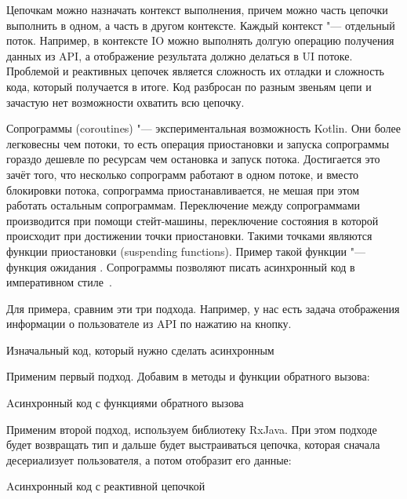 Цепочкам можно назначать контекст выполнения, причем можно часть цепочки выполнить в одном, а часть в другом контексте.
Каждый контекст "--- отдельный поток.
Например, в контексте IO можно выполнять долгую операцию получения данных из API, а отображение результата должно делаться в UI потоке.
Проблемой и реактивных цепочек является сложность их отладки и сложность кода, который получается в итоге.
Код разбросан по разным звеньям цепи и зачастую нет возможности охватить всю цепочку.

Сопрограммы (coroutines) "--- экспериментальная возможность Kotlin.
Они более легковесны чем потоки, то есть операция приостановки и запуска сопрограммы гораздо дешевле по ресурсам чем остановка и запуск потока.
Достигается это зачёт того, что несколько сопрограмм работают в одном потоке, и вместо блокировки потока, сопрограмма приостанавливается, не мешая при этом работать остальным сопрограммам.
Переключение между сопрограммами производится при помощи стейт-машины, переключение состояния в которой происходит при достижении точки приостановки.
Такими точками являются функции приостановки (suspending functions).
Пример такой функции "--- функция ожидания .
Сопрограммы позволяют писать асинхронный код в императивном стиле~\cite{github:coroutines}.

Для примера, сравним эти три подхода.
Например, у нас есть задача отображения информации о пользователе из API по нажатию на кнопку.

\begin{listing}[H]
  \caption{Изначальный код, который нужно сделать асинхронным}
  \label{lst:asyncKtSrc}
\end{listing}

Применим первый подход.
Добавим в методы  и  функции обратного вызова:

\begin{listing}[H]
  \caption{Aсинхронный код с функциями обратного вызова}
  \label{lst:asyncKtCallbacks}
\end{listing}

Применим второй подход, используем библиотеку RxJava.
При этом подходе  будет возвращать тип  и дальше будет выстраиваться цепочка, которая сначала десериализует пользователя, а потом отобразит его данные:

\begin{listing}[H]
  \caption{Aсинхронный код с реактивной цепочкой}
  \label{lst:asyncKtRx}
\end{listing}

